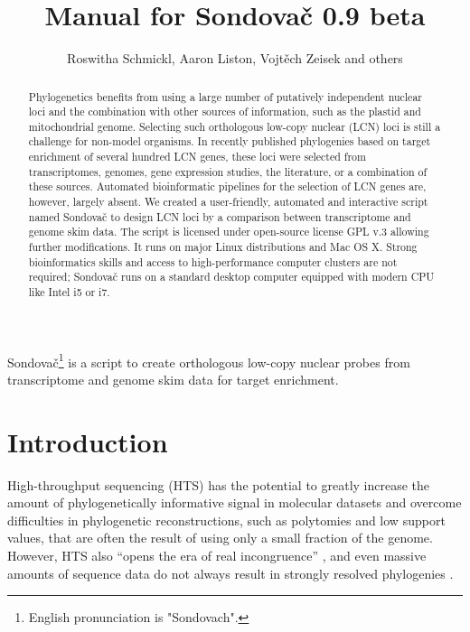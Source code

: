 \documentclass[a4paper, 11pt, twoside]{article}
\title{Manual for Sondovač 0.9 beta}
\author{Roswitha Schmickl, Aaron Liston, Vojtěch Zeisek and others}
\begin{document}
\maketitle
Sondovač\footnote{English pronunciation is "Sondovach".} is a script to create orthologous low-copy nuclear probes from transcriptome and genome skim data for target enrichment.

\begin{abstract}
Phylogenetics benefits from using a large number of putatively independent nuclear loci and the combination with other sources of information, such as the plastid and mitochondrial genome. Selecting such orthologous low-copy nuclear (LCN) loci is still a challenge for non-model organisms. In recently published phylogenies based on target enrichment of several hundred LCN genes, these loci were selected from transcriptomes, genomes, gene expression studies, the literature, or a combination of these sources. Automated bioinformatic pipelines for the selection of LCN genes are, however, largely absent. We created a user-friendly, automated and interactive script named Sondovač to design LCN loci by a comparison between transcriptome and genome skim data. The script is licensed under open-source license GPL v.3 allowing further modifications. It runs on major Linux distributions and Mac OS X. Strong bioinformatics skills and access to high-performance computer clusters are not required; Sondovač runs on a standard desktop computer equipped with modern CPU like Intel i5 or i7.
\end{abstract}

\tableofcontents
\listoffigures
\listoftables
\vskip 1cm



\section{Introduction}

High-throughput sequencing (HTS) has the potential to greatly increase the amount of phylogenetically informative signal in molecular datasets \citep{Parks2009, Parks2012} and overcome difficulties in phylogenetic reconstructions, such as polytomies and low support values, that are often the result of using only a small fraction of the genome. However, HTS also “opens the era of real incongruence” \citep{Jeffroy2006}, and even massive amounts of sequence data do not always result in strongly resolved phylogenies \citep{Pyron2015}.
\end{document}
